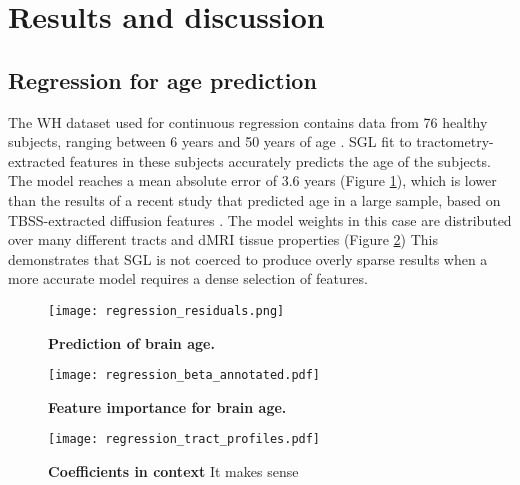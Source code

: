 \section*{Results and discussion}

\subsection*{Regression for age prediction}

The WH dataset used for continuous regression contains data from 76 healthy
subjects, ranging between 6 years and 50 years of age
\cite{yeatman2014lifespan}. SGL fit to tractometry-extracted features in these
subjects accurately predicts the age of the subjects. The model reaches a mean
absolute error of 3.6 years (Figure \ref{fig:regress-results}), which is lower
than the results of a recent study that predicted age in a large sample, based
on TBSS-extracted diffusion features \cite{Richard2018-ux}. The model weights in
this case are distributed over many different tracts and dMRI tissue properties
(Figure \ref{fig:regress-beta}) This demonstrates that SGL is not coerced to
produce overly sparse results when a more accurate model requires a dense
selection of features.


\begin{figure}[!h]
    \centering
    \texttt{[image: regression\_residuals.png]}
    \caption{{\bf Prediction of brain age.}
    }
    \label{fig:regress-results}
\end{figure}

\begin{figure}[!h]
    \centering
    \texttt{[image: regression\_beta\_annotated.pdf]}
    \caption{{\bf Feature importance for brain age.}
    }
    \label{fig:regress-beta}
\end{figure}


\begin{figure}[!h]
    \centering
    \texttt{[image: regression\_tract\_profiles.pdf]}
    \caption{{\bf Coefficients in context}
    It makes sense
    }
    \label{fig:regress-profiles}
\end{figure}


